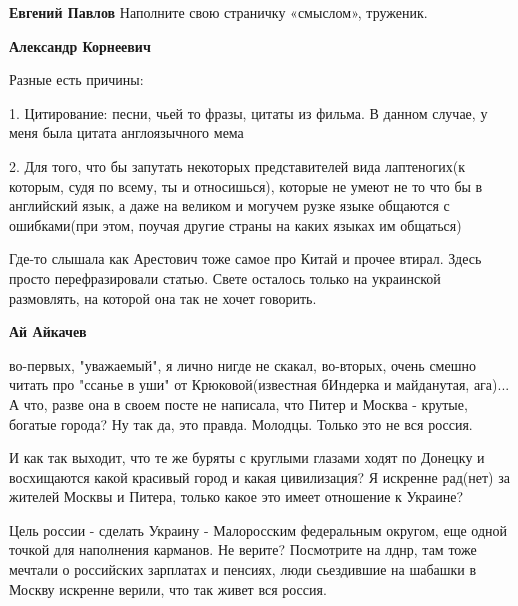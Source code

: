 \begin{itemize}
\begin{itemize}
\textbf{Евгений Павлов} Наполните свою страничку «смыслом», труженик.

 
\textbf{Александр Корнеевич} 

Разные есть причины: 

1. Цитирование: песни, чьей то фразы, цитаты из фильма. В данном случае, у меня
была цитата англоязычного мема 

2. Для того, что бы запутать некоторых представителей вида лаптеногих(к
которым, судя по всему, ты и относишься), которые не умеют не то что бы в
английский язык, а даже на великом и могучем рузке языке общаются с
ошибками(при этом, поучая другие страны на каких языках им общаться)

 
Где-то слышала как Арестович тоже самое про Китай и прочее втирал. Здесь просто перефразировали статью. Свете осталось только на украинской размовлять, на которой она так не хочет говорить.

 
\textbf{Ай Айкачев} 

во-первых, "уважаемый", я лично нигде не скакал, во-вторых, очень смешно читать
про "ссанье в уши" от Крюковой(известная бИндерка и майданутая, ага)... А что,
разве она в своем посте не написала, что Питер и Москва - крутые, богатые
города? Ну так да, это правда. Молодцы. Только это не вся россия. 

И как так выходит, что те же буряты с круглыми глазами ходят по Донецку и
восхищаются какой красивый город и какая цивилизация? Я искренне рад(нет) за
жителей Москвы и Питера, только какое это имеет отношение к Украине? 

Цель россии - сделать Украину - Малоросским федеральным округом, еще одной
точкой для наполнения карманов. Не верите? Посмотрите на лднр, там тоже мечтали
о российских зарплатах и пенсиях, люди сьездившие на шабашки в Москву искренне
верили, что так живет вся россия. 


\end{itemize}
\end{itemize}
